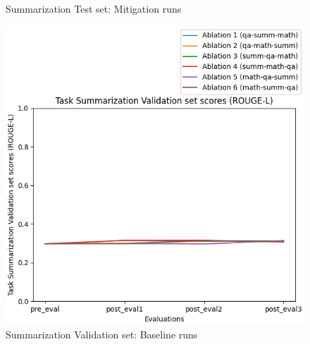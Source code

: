 \begin{figure}[H]
\begin{minipage}{0.45\textwidth}
        \captionsetup{width=1.1\textwidth}
        \caption{Summarization Test set: Mitigation runs}
        \label{SummTestMitigation}
    \end{minipage}
\end{figure}

\begin{figure}[H]
    \centering
    \begin{minipage}{0.45\textwidth}
        \centering
        \includegraphics[width=1.1\textwidth]{Figures/results/trace_baseline_graphs/task_eval/summ_val_Validation_baseline.png} %
        \captionsetup{width=1.1\textwidth}
        \caption{Summarization Validation set: Baseline runs}
        \label{SummValBaseline}
    \end{minipage}\hfill
    \begin{minipage}{0.45\textwidth}
        \centering

\end{minipage}
\end{figure}
